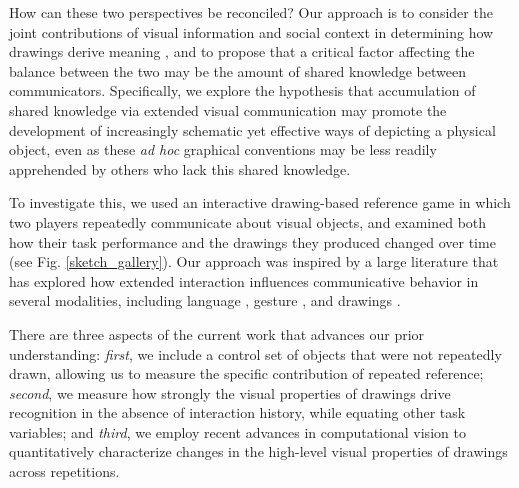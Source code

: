 \documentclass[10pt,letterpaper]{article}
\begin{document}
How can these two perspectives be reconciled?
Our approach is to consider the joint contributions of visual information and social context in determining how drawings derive meaning \cite{abell2009canny}, and to propose that a critical factor affecting the balance between the two may be the amount of shared knowledge between communicators.
Specifically, we explore the hypothesis that accumulation of shared knowledge via extended visual communication may promote the development of increasingly schematic yet effective ways of depicting a physical object, even as these \textit{ad hoc} graphical conventions may be less readily apprehended by others who lack this shared knowledge.

To investigate this, we used an interactive drawing-based reference game in which two players repeatedly communicate about visual objects, and examined both how their task performance and the drawings they produced changed over time (see Fig. \ref{sketch_gallery}). 
Our approach was inspired by a large literature that has explored how extended interaction influences communicative behavior in several modalities, including language \cite{krauss1964changes,ClarkWilkesGibbs86_ReferringCollaborative,HawkinsFrankGoodman17_ConventionFormation}, gesture \cite{goldin1996silence,fay2014creating}, and drawings \cite{garrod_foundations_2007,fay2010interactive}.



There are three aspects of the current work that advances our prior understanding: \emph{first}, we include a control set of objects that were not repeatedly drawn, allowing us to measure the specific contribution of repeated reference; \emph{second}, we measure how strongly the visual properties of drawings drive recognition in the absence of interaction history, while equating other task variables; and \emph{third}, we employ recent advances in computational vision to quantitatively characterize changes in the high-level visual properties of drawings across repetitions.
\end{document}
